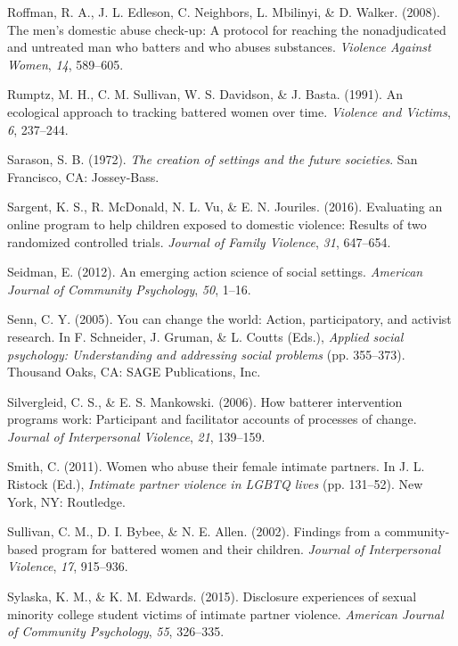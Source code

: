 \documentclass[11pt,]{tufte-book}
\begin{document}
\hypertarget{ref-roffman2008mens}{}
Roffman, R. A., J. L. Edleson, C. Neighbors, L. Mbilinyi, \& D. Walker.
(2008). The men's domestic abuse check-up: A protocol for reaching the
nonadjudicated and untreated man who batters and who abuses substances.
\emph{Violence Against Women}, \emph{14}, 589--605.

\hypertarget{ref-rumptz1991ecological}{}
Rumptz, M. H., C. M. Sullivan, W. S. Davidson, \& J. Basta. (1991). An
ecological approach to tracking battered women over time. \emph{Violence
and Victims}, \emph{6}, 237--244.

\hypertarget{ref-sarason1972creation}{}
Sarason, S. B. (1972). \emph{The creation of settings and the future
societies}. San Francisco, CA: Jossey-Bass.

\hypertarget{ref-sargent2016evaluating}{}
Sargent, K. S., R. McDonald, N. L. Vu, \& E. N. Jouriles. (2016).
Evaluating an online program to help children exposed to domestic
violence: Results of two randomized controlled trials. \emph{Journal of
Family Violence}, \emph{31}, 647--654.

\hypertarget{ref-seidman2012emerging}{}
Seidman, E. (2012). An emerging action science of social settings.
\emph{American Journal of Community Psychology}, \emph{50}, 1--16.

\hypertarget{ref-senn2005you}{}
Senn, C. Y. (2005). You can change the world: Action, participatory, and
activist research. In F. Schneider, J. Gruman, \& L. Coutts (Eds.),
\emph{Applied social psychology: Understanding and addressing social
problems} (pp. 355--373). Thousand Oaks, CA: SAGE Publications, Inc.

\hypertarget{ref-silvergleid2006batterer}{}
Silvergleid, C. S., \& E. S. Mankowski. (2006). How batterer
intervention programs work: Participant and facilitator accounts of
processes of change. \emph{Journal of Interpersonal Violence},
\emph{21}, 139--159.

\hypertarget{ref-smith2011women}{}
Smith, C. (2011). Women who abuse their female intimate partners. In J.
L. Ristock (Ed.), \emph{Intimate partner violence in LGBTQ lives} (pp.
131--52). New York, NY: Routledge.

\hypertarget{ref-sullivan2002findings}{}
Sullivan, C. M., D. I. Bybee, \& N. E. Allen. (2002). Findings from a
community-based program for battered women and their children.
\emph{Journal of Interpersonal Violence}, \emph{17}, 915--936.

\hypertarget{ref-sylaska2015disclosure}{}
Sylaska, K. M., \& K. M. Edwards. (2015). Disclosure experiences of
sexual minority college student victims of intimate partner violence.
\emph{American Journal of Community Psychology}, \emph{55}, 326--335.
\end{document}
